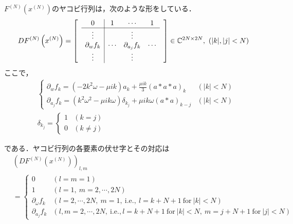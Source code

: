 \begin{dfn}
  $F^{(N)}\left(x^{(N)}\right)$のヤコビ行列は，次のような形をしている．
  \begin{equation*}
    DF^{(N)}\left(x^{(N)}\right)=\begin{bmatrix}
       & \multicolumn{1}{c|}{0}              & 1      & \cdots            & 1      & \\ \cline{2-5}
       & \multicolumn{1}{c|}{\vdots}         &        & \vdots            &        & \\
       & \multicolumn{1}{c|}{\partial_w f_k} & \cdots & \partial_{a_j}f_k & \cdots & \\
       & \multicolumn{1}{c|}{\vdots}         &        & \vdots            &        & \\
    \end{bmatrix}
    \in \mathbb{C}^{2N\times 2N},\ \left(|k|,|j|<N\right)
  \end{equation*}
  ここで，
  \begin{align*}
     & \begin{cases}
         \partial_w f_k = (-2k^2\omega - \mu ik)a_k + \frac{\mu ik}{3}(a*a*a)_k                     & (|k|<N) \\
         \partial_{a_j} f_k = (k^2\omega^2 - \mu ik\omega)\delta_{k_j} + \mu ik\omega(a*a)_{k-j} & (|k|<N)
       \end{cases}
    \\
     & \delta_{k_j} = \begin{cases}
                        1 & (k=j)     \\
                        0 & (k\neq j)
                      \end{cases}
  \end{align*}
\end{dfn}
である．ヤコビ行列の各要素の伏せ字とその対応は
\begin{align*}
   & \left(DF^{(N)}\left(x^{(N)}\right)\right)_{l,m}                                                                                        \\
   & = \begin{cases}
         0                   & \left(l=m=1\right)                                                                                             \\
         1                   & \left(l=1,\ m= 2,\cdots,2N\right)                                                                              \\
         \partial_\omega f_k & \left(l=2,\cdots,2N,\ m=1, \ \mathrm{i.e.},\ l=k+N+1 \ \mathrm{for} \ |k|<N\right)                             \\
         \partial_{a_j}f_k   & \left(l,m=2,\cdots,2N, \ \mathrm{i.e.}, l=k+N+1 \ \mathrm{for} \ |k|<N,\ m=j+N+1 \ \mathrm{for} \ |j|<N\right)
       \end{cases}
\end{align*}

